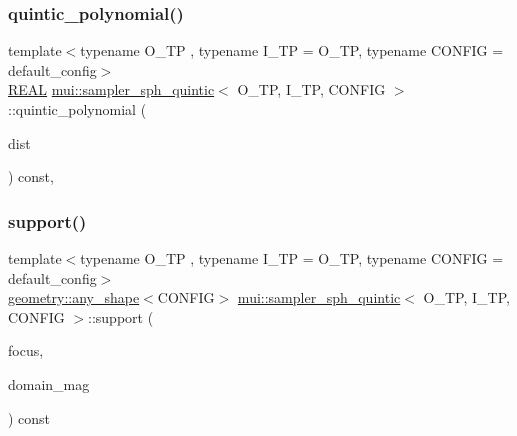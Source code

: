 \subsubsection{\texorpdfstring{quintic\+\_\+polynomial()}{quintic\_polynomial()}}
{\footnotesize\ttfamily template$<$typename O\+\_\+\+TP , typename I\+\_\+\+TP  = O\+\_\+\+TP, typename C\+O\+N\+F\+IG  = default\+\_\+config$>$ \\
\hyperlink{classmui_1_1sampler__sph__quintic_ab47a0d5297b716d51c2ab6857f586103}{R\+E\+AL} \hyperlink{classmui_1_1sampler__sph__quintic}{mui\+::sampler\+\_\+sph\+\_\+quintic}$<$ O\+\_\+\+TP, I\+\_\+\+TP, C\+O\+N\+F\+IG $>$\+::quintic\+\_\+polynomial (\begin{DoxyParamCaption}\item[{const \hyperlink{classmui_1_1sampler__sph__quintic_ab47a0d5297b716d51c2ab6857f586103}{R\+E\+AL}}]{dist }\end{DoxyParamCaption}) const\hspace{0.3cm}{\ttfamily [inline]}, {\ttfamily [protected]}}

\mbox{\label{classmui_1_1sampler__sph__quintic_a5576808cb3907b4f30fb07eaf5810425}} 
\subsubsection{\texorpdfstring{support()}{support()}}
{\footnotesize\ttfamily template$<$typename O\+\_\+\+TP , typename I\+\_\+\+TP  = O\+\_\+\+TP, typename C\+O\+N\+F\+IG  = default\+\_\+config$>$ \\
\hyperlink{classmui_1_1geometry_1_1any__shape}{geometry\+::any\+\_\+shape}$<$C\+O\+N\+F\+IG$>$ \hyperlink{classmui_1_1sampler__sph__quintic}{mui\+::sampler\+\_\+sph\+\_\+quintic}$<$ O\+\_\+\+TP, I\+\_\+\+TP, C\+O\+N\+F\+IG $>$\+::support (\begin{DoxyParamCaption}\item[{\hyperlink{classmui_1_1sampler__sph__quintic_a81bf989d55a1247625c7783d9326d78b}{point\+\_\+type}}]{focus,  }\item[{\hyperlink{classmui_1_1sampler__sph__quintic_ab47a0d5297b716d51c2ab6857f586103}{R\+E\+AL}}]{domain\+\_\+mag }\end{DoxyParamCaption}) const\hspace{0.3cm}{\ttfamily [inline]}}



